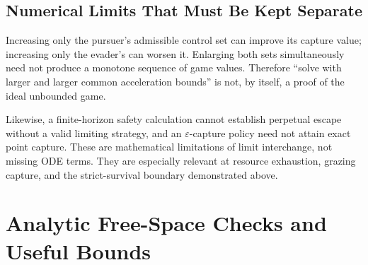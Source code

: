 \documentclass[journal,a4paper]{IEEEtran}
\begin{document}
\subsection{Numerical Limits That Must Be Kept Separate}
Increasing only the pursuer's admissible control set can improve its capture value; increasing only the evader's can worsen it. Enlarging both sets simultaneously need not produce a monotone sequence of game values. Therefore ``solve with larger and larger common acceleration bounds'' is not, by itself, a proof of the ideal unbounded game.

Likewise, a finite-horizon safety calculation cannot establish perpetual escape without a valid limiting strategy, and an $\varepsilon$-capture policy need not attain exact point capture. These are mathematical limitations of limit interchange, not missing ODE terms. They are especially relevant at resource exhaustion, grazing capture, and the strict-survival boundary demonstrated above.

\section{Analytic Free-Space Checks and Useful Bounds}
\label{sec:benchmarks}
\end{document}
